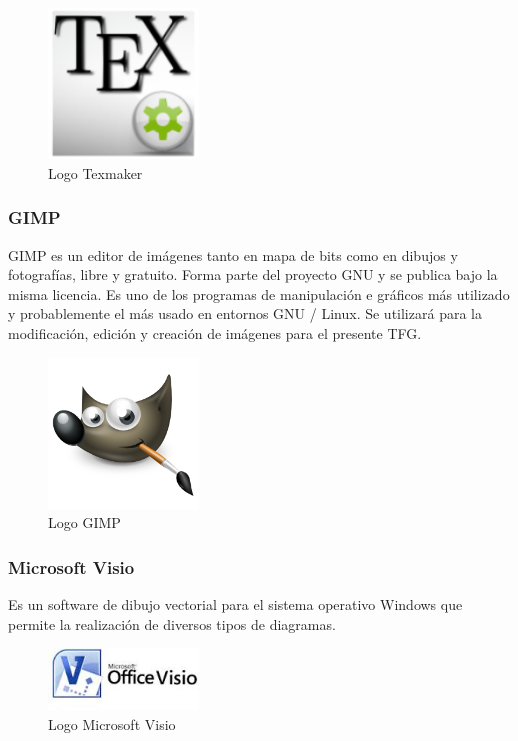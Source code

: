 		\begin{figure}[H]
		\centering
		\includegraphics[width=40mm, fbox={\fboxrule} 4mm]{images/04-metodo/34-texmaker_logo.png}
		\caption{Logo Texmaker}
		\label{fig:texmaker-logo}
		\end{figure}
		
		\subsubsection{\ac{GIMP}}
		\ac{GIMP} es un editor de imágenes tanto en mapa de bits como en dibujos y fotografías, libre y gratuito. Forma parte del proyecto \ac{GNU} y se publica bajo la misma licencia. Es uno de los programas de manipulación e gráficos más utilizado y probablemente el más usado en entornos GNU / Linux. Se utilizará para la modificación, edición y creación de imágenes para el presente \ac{TFG}.
		
		\begin{figure}[H]
		\centering
		\includegraphics[width=40mm, fbox={\fboxrule} 4mm]{images/04-metodo/35-gimp_logo.png}
		\caption{Logo \ac{GIMP}}
		\label{fig:gimp-logo}
		\end{figure}
		
		\subsubsection{Microsoft Visio}
		Es un software de dibujo vectorial para el sistema operativo Windows que permite la realización de diversos tipos de diagramas. 
		
		\begin{figure}[H]
		\centering
		\includegraphics[width=40mm, fbox={\fboxrule} 4mm]{images/04-metodo/36-visio_logo.jpg}
		\caption{Logo Microsoft Visio}
		\label{fig:visio-logo}
		\end{figure}
	
